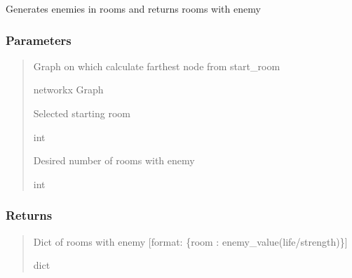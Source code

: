 \documentclass[letterpaper,10pt,english]{sphinxmanual}
\begin{document}
\begin{fulllineitems}
\label{\detokenize{api_reference/dungeon_resolver/generate_dungeon_problem:generate_dungeon_problem.generate_enemies}}
\pysigstartsignatures
{}
\pysigstopsignatures
\sphinxAtStartPar
Generates enemies in rooms and returns rooms with enemy


\subsubsection{Parameters}
\label{\detokenize{api_reference/dungeon_resolver/generate_dungeon_problem:id2}}\begin{quote}\begin{description}
\sphinxAtStartPar
Graph on which calculate farthest node from start\_room

\sphinxAtStartPar
networkx Graph

\sphinxAtStartPar
Selected starting room

\sphinxAtStartPar
int

\sphinxAtStartPar
Desired number of rooms with enemy

\sphinxAtStartPar
int

\end{description}\end{quote}


\subsubsection{Returns}
\label{\detokenize{api_reference/dungeon_resolver/generate_dungeon_problem:id3}}\begin{quote}\begin{description}
\sphinxAtStartPar
Dict of rooms with enemy {[}format: \{room : enemy\_value(life/strength)\}{]}

\sphinxAtStartPar
dict

\end{description}\end{quote}

\end{fulllineitems}
\end{document}
